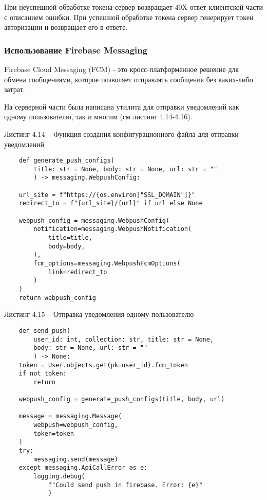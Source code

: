 При неуспешной обработке токена сервер возвращает 40X ответ клиентской части с описанием ошибки.
При успешной обработке токена сервер генерирует токен авторизации и возвращает его в ответе.

\subsubsection{Использование Firebase Messaging}\hfill

Firebase Cloud Messaging (FCM) - это кросс-платформенное решение для обмена сообщениями, которое позволяет  отправлять сообщения без каких-либо затрат.

На серверной части была написана утилита для отправки уведомлений как одному пользователю, так и многим (см листинг 4.14-4.16).


Листинг 4.14 – Функция создания конфигурационного файла для отправки уведомлений
\begin{lstlisting}
    def generate_push_configs(
        title: str = None, body: str = None, url: str = ""
        ) -> messaging.WebpushConfig:

    url_site = f"https://{os.environ["SSL_DOMAIN"]}"
    redirect_to = f"{url_site}/{url}" if url else None

    webpush_config = messaging.WebpushConfig(
        notification=messaging.WebpushNotification(
            title=title,
            body=body,
        ),
        fcm_options=messaging.WebpushFcmOptions(
            link=redirect_to
        )
    )
    return webpush_config
\end{lstlisting}

Листинг 4.15 – Отправка уведомления одному пользователю
\begin{lstlisting}
    def send_push(
        user_id: int, collection: str, title: str = None,
        body: str = None, url: str = ""
        ) -> None:
    token = User.objects.get(pk=user_id).fcm_token
    if not token:
        return

    webpush_config = generate_push_configs(title, body, url)

    message = messaging.Message(
        webpush=webpush_config,
        token=token
    )
    try:
        messaging.send(message)
    except messaging.ApiCallError as e:
        logging.debug(
            f"Could send push in firebase. Error: {e}"
            )
\end{lstlisting}

